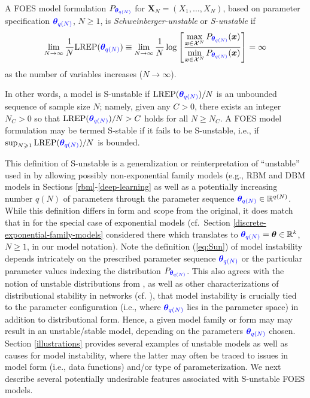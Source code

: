 \documentclass[numbib]{imamat}
\theoremstyle{theorem}
\theoremstyle{lemma}
\theoremstyle{example}
\theoremstyle{corollary}
\theoremstyle{definition}
\theoremstyle{remark}
\theoremstyle{approximation}
\theoremstyle{scheme}
\newcommand{\REP}{\mathrm{LREP}}
\newcommand{\thetaidx}{q(N)}
\newcommand{\thetaN}{\boldsymbol \theta_{\thetaidx}}
\newcommand{\ak}[1]{{\color{blue} #1}}
\let\BeginKnitrBlock\begin \let\EndKnitrBlock\end
\begin{document}
\BeginKnitrBlock{definition}[S-unstable FOES model]
\protect\hypertarget{def:instabFSFS}{}{\label{def:instabFSFS} \iffalse (S-unstable FOES model) \fi{} }A FOES model formulation \ak{$P_{\ak{\thetaN}}$} for \(\boldsymbol X_N=(X_1,\ldots,X_N)\), \ak{based on parameter specification $\ak{\thetaN}$, $N \geq 1$,} is \emph{Schweinberger-unstable} or \emph{S-unstable} if
\begin{equation}
\label{eq:Sun}
\lim \limits_{N \rightarrow \infty} \frac{1}{N} \REP(\ak{\thetaN}) \equiv \lim \limits_{N \rightarrow \infty} \frac{1}{N}\log \left[\frac{\max\limits_{  \boldsymbol x\in \mathcal{X}^N}P_{\ak{\thetaN}}( \boldsymbol x)}{\min\limits_{ \boldsymbol x \in \mathcal{X}^N}P_{\ak{\thetaN}}( \boldsymbol x)}\right] = \infty
\end{equation}
as the number of variables increases (\(N \rightarrow \infty\)).
\EndKnitrBlock{definition}

In other words, a model is S-unstable if \(\REP(\ak{\thetaN})/N\) is an unbounded sequence of sample size \(N\); namely, given any \(C > 0\), there exists an integer \(N_C > 0\) so that \(\REP(\ak{\thetaN})/N > C\) holds for all \(N \ge N_C\). A FOES model formulation may be termed S-stable if it fails to be S-unstable, i.e., if \(\sup_{N \geq 1}\REP(\ak{\thetaN})/N\) is bounded.

This definition of S-unstable is a generalization or reinterpretation of ``unstable'' used in \citet{schweinberger2011instability} by allowing possibly non-exponential family models (e.g., RBM and DBM models in Sections \ref{rbm}-\ref{deep-learning} as well as a potentially increasing number \(q(N)\) of parameters through the parameter sequence \(\ak{\thetaN}\in \mathbb{R}^{q(N)}\). While this definition differs in form and scope from the original, it does match that in \citet{schweinberger2011instability} for the special case of exponential models (cf.~Section \ref{discrete-exponential-family-models} considered there \ak{which translates to $\ak{\thetaN}=\boldsymbol{\theta} \in \mathbb{R}^k$, $N \geq 1$, in our model notation). Note the definition (\ref{eq:Sun}) of model instability depends intricately on the prescribed parameter sequence $\ak{\thetaN}$ or the particular parameter values indexing the distribution $P_{\ak{\thetaN}}$. This also agrees with the notion of unstable distributions from \citet{schweinberger2011instability}, as well as other characterizations of distributional stability in networks (cf. \citet{handcock2003assessing}), that model instability is crucially tied to the parameter configuration (i.e., where $\ak{\thetaN}$ lies in the parameter space) in addition to distributional form.  Hence, a given model family or form may may result in an unstable/stable model, depending on the parameters $\ak{\thetaN}$ chosen.} Section \ref{illustrations} provides several examples of unstable models as well as causes for model instability, where the latter may often be traced to issues in model form (i.e., data functions) and/or \ak{type of} parameterization. We next describe several potentially undesirable features associated with S-unstable FOES models.
\end{document}
